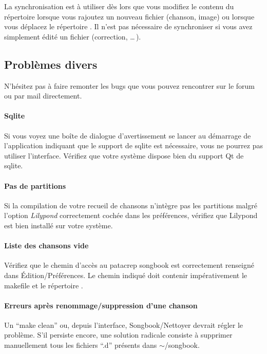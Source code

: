\documentclass[online]{patacrep}
\begin{document}
\begin{nota}
  La synchronisation est à utiliser dès lors que vous modifiez le
  contenu du répertoire  lorsque vous rajoutez un nouveau
  fichier (chanson, image) ou lorsque vous déplacez le répertoire
  .  Il n'est pas nécessaire de synchroniser si vous
  avez simplement édité un fichier (correction, \dots\,).
\end{nota}

\subsection{Problèmes divers}

N'hésitez pas à faire remonter les bugs que vous pouvez rencontrer sur
le forum ou par mail directement.

\paragraph{Sqlite} 
Si vous voyez une boîte de dialogue d'avertissement se lancer au
démarrage de l'application indiquant que le support de sqlite est
nécessaire, vous ne pourrez pas utiliser l'interface. Vérifiez que
votre système dispose bien du support Qt de sqlite.

\paragraph{Pas de partitions}
Si la compilation de votre recueil de chansons n'intègre pas les
partitions malgré l'option \emph{Lilypond} correctement cochée dans les
préférences, vérifiez que Lilypond est bien installé sur votre système. 

\paragraph{Liste des chansons vide} 
Vérifiez que le chemin d'accès au patacrep songbook est correctement
renseigné dans Édition/Préférences.  Le chemin indiqué doit contenir
impérativement le makefile et le répertoire .

\paragraph{Erreurs après renommage/suppression d'une chanson} 
Un ``make clean'' ou, depuis l'interface, Songbook/Nettoyer devrait
régler le problème. S'il persiste encore, une solution radicale
consiste à supprimer manuellement tous les fichiers ``.d'' présents
dans $\sim$/songbook.
\end{document}
